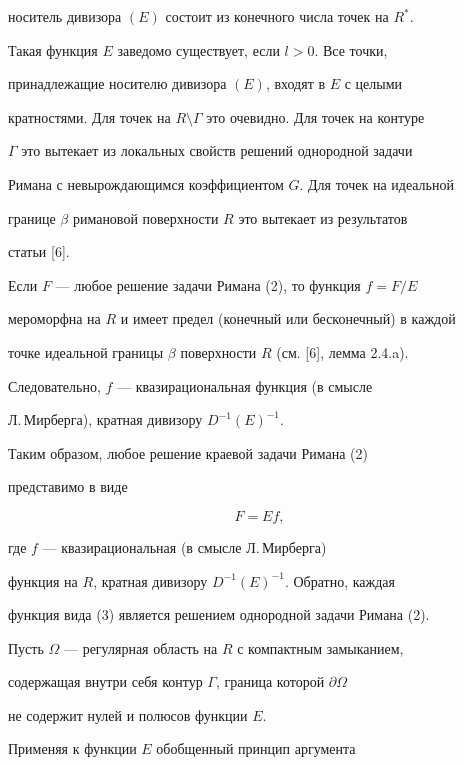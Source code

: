 носитель дивизора $(E)$ состоит из конечного числа точек на $R^*$.


Такая функция $E$ заведомо существует, если $l>0$. Все точки,


принадлежащие носителю дивизора $(E)$, входят в $E$ с целыми


кратностями. Для точек на $R\setminus\Gamma$ это очевидно. Для точек на контуре


$\Gamma$ это вытекает из локальных свойств решений однородной задачи


Римана с невырождающимся коэффициентом $G$. Для точек на идеальной


границе $\beta$ римановой поверхности $R$ это вытекает из результатов


статьи [6].





Если $F$ --- любое решение задачи Римана (2), то функция $f=F/E$


мероморфна на $R$ и имеет предел (конечный или бесконечный) в каждой


точке идеальной границы $\beta$ поверхности $R$ (см. [6], лемма 2.4.a).


Следовательно, $f$ --- квазирациональная функция (в смысле


Л.\,Мирберга), кратная дивизору $D^{-1}(E)^{-1}$.


Таким образом, любое решение краевой задачи Римана (2)


представимо в виде


\begin{equation}


F=Ef,


\end{equation}


где $f$ ---  квазирациональная (в смысле Л.\,Мирберга)


функция на $R$, кратная дивизору $D^{-1}(E)^{-1}$. Обратно, каждая


функция вида (3) является решением  однородной задачи Римана (2).





Пусть $\Omega$ --- регулярная область на $R$ с компактным замыканием,


содержащая внутри себя контур $\Gamma$, граница которой $\partial \Omega$


не содержит нулей и полюсов функции $E$.


Применяя к функции $E$ обобщенный принцип аргумента


